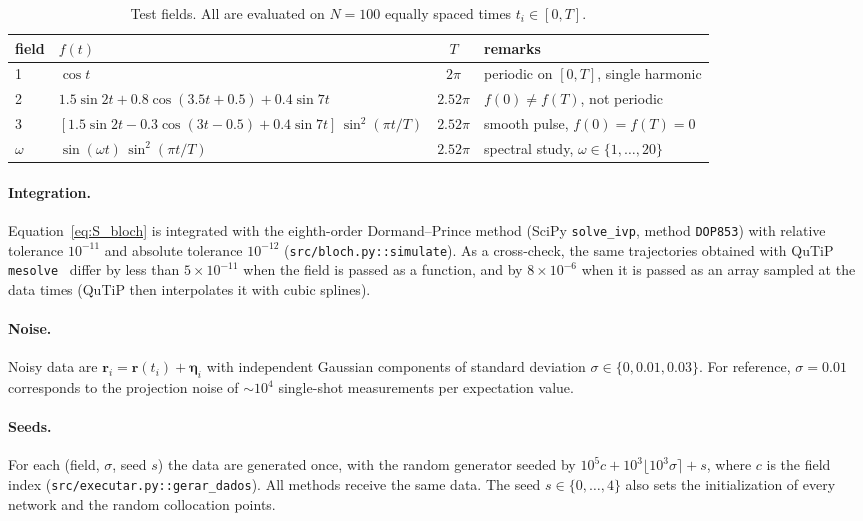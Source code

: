 \documentclass[aps,pra,onecolumn,superscriptaddress,11pt,longbibliography,floatfix,nofootinbib]{revtex4-2}
\newcommand{\rvec}{\bm r}
\begin{document}
\begin{table}[h]
  \caption{Test fields. All are evaluated on $N=100$ equally spaced times $t_i\in[0,T]$.}
  \label{tab:fields}
  \begin{tabular}{llcl}
    \toprule
    field & $f(t)$ & $T$ & remarks \\
    \midrule
    1 & $\cos t$ & $2\pi$ & periodic on $[0,T]$, single harmonic \\
    2 & $1.5\sin2t+0.8\cos(3.5t+0.5)+0.4\sin7t$ & $2.52\pi$ & $f(0)\ne f(T)$, not periodic \\
    3 & $[1.5\sin2t-0.3\cos(3t-0.5)+0.4\sin7t]\,\sin^2(\pi t/T)$ & $2.52\pi$ & smooth pulse, $f(0)=f(T)=0$ \\
    $\omega$ & $\sin(\omega t)\,\sin^2(\pi t/T)$ & $2.52\pi$ & spectral study, $\omega\in\{1,\dots,20\}$ \\
    \bottomrule
  \end{tabular}
\end{table}

\paragraph{Integration.} Equation~\eqref{eq:S_bloch} is integrated with the eighth-order
Dormand--Prince method (SciPy \texttt{solve\_ivp}, method \texttt{DOP853}) with relative tolerance
$10^{-11}$ and absolute tolerance $10^{-12}$ (\texttt{src/bloch.py::simulate}). As a cross-check, the
same trajectories obtained with QuTiP \texttt{mesolve}~\cite{johansson2013qutip} differ by less than
$5\times10^{-11}$ when the field is passed as a function, and by $8\times10^{-6}$ when it is passed as an
array sampled at the data times (QuTiP then interpolates it with cubic splines).

\paragraph{Noise.} Noisy data are $\rvec_i=\rvec(t_i)+\bm\eta_i$ with independent Gaussian components of
standard deviation $\sigma\in\{0,0.01,0.03\}$. For reference, $\sigma=0.01$ corresponds to the
projection noise of $\sim\!10^4$ single-shot measurements per expectation value.

\paragraph{Seeds.} For each (field, $\sigma$, seed $s$) the data are generated once, with the random
generator seeded by $10^5c+10^3\lfloor10^3\sigma\rceil+s$, where $c$ is the field index
(\texttt{src/executar.py::gerar\_dados}). All methods receive the same data. The seed $s\in\{0,\dots,4\}$
also sets the initialization of every network and the random collocation points.
\end{document}
